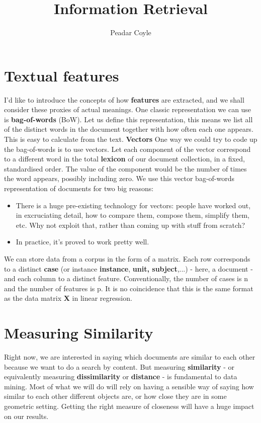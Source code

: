 \documentclass[a4paper,10pt]{article}
\title{Information Retrieval}
\author{Peadar Coyle}
\begin{document}
\maketitle


\section{Textual features}
I'd like to introduce the concepts of how \textbf{features} are extracted, and we shall consider these proxies of 
actual meanings. One classic representation we can use is \textbf{bag-of-words} (BoW).
Let us define this representation, this means we list all of the distinct words in the document together
with how often each one appears. This is easy to calculate from the text.
\textbf{Vectors} One way we could try to code up the bag-of-words is to use vectors. Let each component of the 
vector correspond to a different word in the total \textbf{lexicon} of our document collection, in a fixed, standardised order.
The value of the component would be the number of times the word appears, possibly including zero. 
   We use this vector bag-of-words representation of documents for two big reasons: 
\begin{itemize}
 \item There is a huge pre-existing technology for vectors: people have worked out, 
in excruciating detail, how to compare them, compose them, simplify them, etc. Why not exploit that, rather
than coming up with stuff from scratch? 
\item In practice, it's proved to work pretty well.
\end{itemize}
We can store data from a corpus in the form of a matrix. Each row corresponds to a distinct \textbf{case}
(or instance \textbf{instance}, \textbf{unit, subject},...) - here, a document - and each column to a 
distinct feature. Conventionally, the number of cases is n and the number of features is p. It is no coincidence
that this is the same format as the data matrix \textbf{X} in linear regression.
\section{Measuring Similarity}
Right now, we are interested in saying which documents are similar to each other because we want
to do a search by content. But measuring \textbf{similarity} - or equivalently measuring \textbf{dissimilarity} or \textbf{distance}
- is fundamental to data mining. Most of what we will do will rely on having a sensible way of saying how similar to each other different objects are, or how close they are in some geometric setting. Getting the right measure of closeness will have a huge
impact on our results. 
\end{document}

